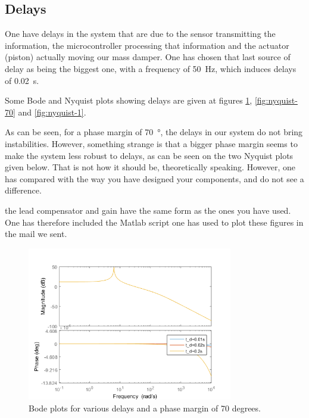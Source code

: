 \subsection{Delays}
One have delays in the system that are due to the sensor transmitting the information, the microcontroller processing that information and the actuator (piston) actually moving our mass damper. One has chosen that last source of delay as being the biggest one, with a frequency of \SI{50}{\hertz}, which induces delays of \SI{0.02}{\second}.\par
Some Bode and Nyquist plots showing delays are given at figures \ref{fig:bode-70}, \ref{fig:nyquist-70} and \ref{fig:nyquist-1}.\par
As can be seen, for a phase margin of \SI{70}{\degree}, the delays in our system do not bring instabilities. However, something strange is that a bigger phase margin seems to make the system less robust to delays, as can be seen on the two Nyquist plots given below. That is not how it should be, theoretically speaking. However, one has compared with the way you have designed your components, and do not see a difference.\par
the lead compensator and gain have the same \og{}form\fg{} as the ones you have used. One has therefore included the Matlab script one has used to plot these figures in the mail we sent.
\begin{figure}[H]
    \centering
    \includegraphics[width=0.8\textwidth]{resources/png/bode-70.png}
    \caption{Bode plots for various delays and a phase margin of 70 degrees.}
    \label{fig:bode-70}
\end{figure}
